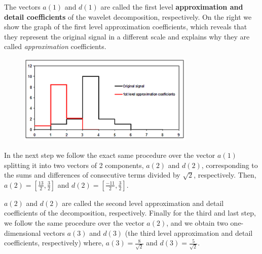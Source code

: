 The vectors $a(1)$ and $d(1)$ are called the first level \textbf{approximation and detail coefficients} of the wavelet decomposition, respectively. On the right we show the graph of the first level approximation coefficients, which reveals that they represent the original signal in a different scale and explains why they are called \emph{approximation} coefficients.
	\begin{figure}[H]
	\centering
	\includegraphics[width=0.75\textwidth]{../sections/seasons/season1/107/images/original_signal_2.png} 
	\end{figure}


In the next step we follow the exact same procedure over the vector $a(1)$ splitting it into two vectors of 2 components, $a(2)$ and $d(2)$, corresponding to the sums and differences of consecutive terms divided by $\sqrt{2}$, respectively. Then, $a(2)= \left[ \frac{13}{2}, \frac{3}{2} \right]$ and $d(2)= \left[ \frac{-11}{2}, \frac{3}{2} \right]$.


$a(2)$ and $d(2)$ are called the second level approximation and detail coefficients of the decomposition, respectively. Finally for the third and last step, we follow the same procedure over the vector $a(2)$, and we obtain two one-dimensional vectors $a(3)$ and $d(3)$ (the third level approximation and detail coefficients, respectively) where,  $a(3)= \frac{8}{\sqrt{2}}$ and $d(3)= \frac{5}{\sqrt{2}}$.


